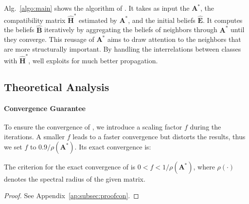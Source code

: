 \subsection{\methodexp}
Alg.~\ref{algo:main} shows the algorithm of \methodexp. 
It takes as input the \emphasis ${\boldsymbol A}^{*}$,
the compatibility matrix $\hat{{\boldsymbol H}}^{*}$ estimated by ${\boldsymbol A}^{*}$, and the initial beliefs $\hat{{\boldsymbol E}}$.
It computes
the beliefs $\hat{{\boldsymbol B}}$ iteratively 
by aggregating the beliefs of neighbors through ${\boldsymbol A}^{*}$ until they converge.
This reusage of ${\boldsymbol A}^{*}$ aims to draw attention to the neighbors that are more structurally important. 
By handling the interrelations between classes with $\hat{{\boldsymbol H}}^{*}$, \method well exploits \nef for much better propagation.

\subsection{Theoretical Analysis} \label{ssec:ta}

\paragraph{Convergence Guarantee}
To ensure the convergence of \methodexp, we introduce a scaling factor $f$ during the iterations. 
A smaller $f$ leads to a faster convergence but distorts the results, thus we set $f$ to $0.9 / \rho{({\boldsymbol A}^{*})}$. 
Its exact convergence is:
\begin{lemma} \label{lem:con}
The criterion for the exact convergence of \methodexp is 
 $0 < f < 1/\rho{({\boldsymbol A}^{*})}$,
where $\rho{(\cdot)}$ denotes the spectral radius of the given matrix.
\end{lemma}
\begin{proof}
See Appendix~\ref{ap:subsec:proofcon}.
\end{proof}


